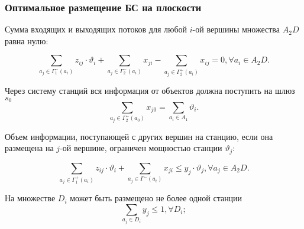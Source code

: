 \begin{frame}
    \frametitle{Оптимальное размещение БС на плоскости}
    \fontsize{8pt}{7.2}\selectfont

    Сумма входящих и выходящих потоков для любой $i$-ой вершины множества $A_2D$ равна нулю:

\begin{equation}\label{eq:part2_1.6}
    \sum_{a_j \in \Gamma_1^-(a_i)} z_{ij} \cdot \vartheta_i + \sum_{a_j \in \Gamma_2^-(a_i)} x_{ji} -  \sum_{a_j \in \Gamma_2^+(a_i)} x_{ij} =0 ,\forall a_i \in A_2D. 
\end{equation}

Через систему станций вся информация от объектов  должна поступить на шлюз $s_0$
\begin{equation}\label{eq:part2_1.7}
    \sum_{a_j \in \Gamma_2^-(a_0)} x_{j0} = \sum_{a_i \in A_1} \vartheta_i.
\end{equation}


Объем информации, поступающей с других вершин на станцию, если она размещена на $j$-ой вершине, ограничен мощностью станции $\vartheta_j$:

\begin{equation}\label{eq:part2_1.8}
    \sum_{a_j \in \Gamma_1^+(a_i)} z_{ij} \cdot \vartheta_i + \sum_{a_j \in \Gamma^-(a_i)} x_{ji} \leqslant y_j \cdot \vartheta_j, \forall a_j \in A_2D.
\end{equation}



На множестве $D_i$ может быть размещено не более одной станции
\begin{equation}\label{eq:part2_1.9}
    \sum_{a_j \in D_i} y_j \leqslant 1, \forall D_i;
\end{equation}


\end{frame}

